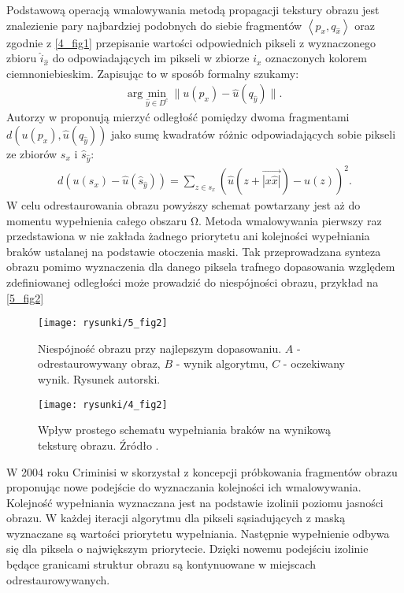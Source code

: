 \documentclass[a4paper,12pt,twoside,openany]{report}
\begin{document}
Podstawową operacją wmalowywania metodą propagacji tekstury obrazu jest znalezienie pary
 najbardziej podobnych do siebie fragmentów $\left\langle p_{x}, q_{\hat{x}} \right\rangle $ oraz zgodnie z \autoref{4_fig1} przepisanie wartości odpowiednich pikseli z wyznaczonego zbioru $\hat{i}_{\hat{x}}$ do odpowiadających im pikseli w zbiorze $i_x$ oznaczonych kolorem ciemnoniebieskim. Zapisując to w sposób formalny szukamy:
\begin{align}
\mathrm{arg} \mathop{\mathrm{min}}_{\hat{y} \in D^c} \big\| u(p_x) - \hat{u} (q_{\hat{y}} ) \big\| .
\label{FROBDIST}
\end{align}
Autorzy w \cite{criminisi2004region} proponują mierzyć odległość pomiędzy dwoma fragmentami $d\left( u(p_x), \hat{u} (q_{\hat{y}}) \right)$ jako sumę kwadratów różnic odpowiadających sobie pikseli ze zbiorów $s_x$ i ${\hat{s}}_{\hat{y}}$:
\begin{align}
d\left( u(s_x) - \hat{u}( \hat{s}_{\hat{y}} )\right)= \sum_{z \in s_x} \left( \hat{u}(z + \overrightarrow{|x \hat{x}|}) - u(z) \right)^2 .
\label{FROBENIUS2} 
\end{align}
W celu odrestaurowania obrazu powyższy schemat powtarzany jest aż do momentu wypełnienia całego obszaru $\mathrm{\Omega }$.
Metoda wmalowywania pierwszy raz przedstawiona w  \cite{efros1999texture} nie zakłada żadnego priorytetu ani kolejności wypełniania braków ustalanej na podstawie otoczenia maski. Tak przeprowadzana synteza obrazu pomimo wyznaczenia dla danego piksela trafnego dopasowania względem zdefiniowanej odległości może prowadzić do niespójności obrazu, przykład na \autoref{5_fig2}
\begin{figure}[!h]
	\centering
	\texttt{[image: rysunki/5\_fig2]}
	\caption{Niespójność obrazu przy najlepszym dopasowaniu. $A$ - odrestaurowywany obraz, $B$ - wynik algorytmu, $C$ - oczekiwany wynik. Rysunek autorski.}
	\label{5_fig2} 
\end{figure}
\begin{figure}[!h]
	\centering
	\texttt{[image: rysunki/4\_fig2]}
	\caption{Wpływ prostego schematu wypełniania braków na wynikową teksturę obrazu. Źródło \cite{criminisi2004region}.}
	\label{4_fig2} 
\end{figure}
W 2004 roku Criminisi w \cite{criminisi2004region} skorzystał z koncepcji próbkowania fragmentów obrazu proponując nowe podejście do wyznaczania kolejności ich wmalowywania.  Kolejność wypełniania wyznaczana jest na podstawie izolinii poziomu jasności obrazu. W każdej iteracji algorytmu dla pikseli sąsiadujących z maską wyznaczane są wartości priorytetu wypełniania. Następnie wypełnienie odbywa się dla piksela o największym priorytecie. Dzięki nowemu podejściu izolinie będące granicami struktur obrazu są kontynuowane w miejscach odrestaurowywanych.
\end{document}
